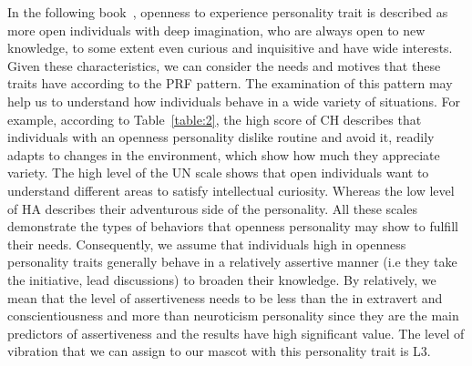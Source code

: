In the following book~\cite{matthews2003personality}, openness to experience
personality trait is described as more open individuals with deep imagination,
who are always open to new knowledge, to some extent even curious and inquisitive and have wide interests.
Given these characteristics, we can consider the needs and motives that these traits have according to the PRF pattern.
The examination of this pattern may help us to understand how individuals behave in a wide variety of situations.
For example, according to Table~\ref{table:2}, the high score of CH describes that
individuals with an openness personality dislike routine and avoid it, readily adapts to changes
in the environment, which show how much they appreciate variety.
The high level of the UN scale shows that open individuals want to understand
different areas to satisfy intellectual curiosity.
Whereas the low level of HA describes their adventurous side of the personality.
All these scales demonstrate the types of behaviors that openness personality may show to fulfill their needs.
Consequently, we assume that individuals high in openness
personality traits generally behave in a relatively assertive manner
(i.e they take the initiative, lead discussions) to broaden their knowledge.
By relatively, we mean that the level of assertiveness needs to be less than the in
extravert and conscientiousness and more than neuroticism personality since they are the
main predictors of assertiveness and the results have high significant value.
The level of vibration that we can assign to our mascot with this personality trait is L3.
 

